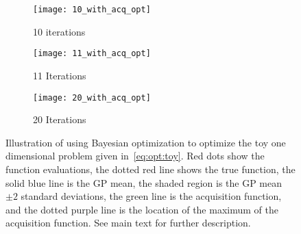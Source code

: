 \begin{figure}[t]
	\centering
		\begin{subfigure}[b]{0.32\textwidth}
			\texttt{[image: 10\_with\_acq\_opt]}
			\caption{10 iterations \label{fig:opt:bayes-opt:10}}
		\end{subfigure}
			\begin{subfigure}[b]{0.32\textwidth}
			\texttt{[image: 11\_with\_acq\_opt]}
			\caption{11 Iterations \label{fig:opt:bayes-opt:11}}
		\end{subfigure}
			\begin{subfigure}[b]{0.32\textwidth}
			\texttt{[image: 20\_with\_acq\_opt]}
			\caption{20 Iterations \label{fig:opt:bayes-opt:20}}
		\end{subfigure}
\vspace{5pt}
	\caption{Illustration of using Bayesian optimization to optimize the
		toy one dimensional problem given in~\eqref{eq:opt:toy}.  Red dots show
		the function evaluations,  the dotted red line shows the true function, 
		the solid blue line is the GP mean, the shaded region is the GP mean $\pm 2$
		standard deviations, the green line is the acquisition function, and
		the dotted purple line is the location of the maximum of the acquisition
		function. See main text for further description.\label{fig:opt:bayes-opt}}
\end{figure}

